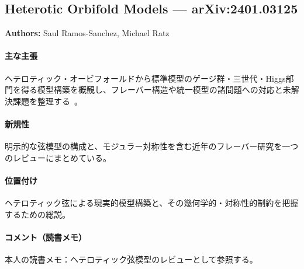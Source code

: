 \subsection{Heterotic Orbifold Models --- arXiv:2401.03125}

\textbf{Authors:} Saul Ramos-Sanchez, Michael Ratz

\paragraph{主な主張}
ヘテロティック・オービフォールドから標準模型のゲージ群・三世代・Higgs部門を得る模型構築を概観し、フレーバー構造や統一模型の諸問題への対応と未解決課題を整理する~\cite{Ramos-Sanchez:2024keh}。

\paragraph{新規性}
明示的な弦模型の構成と、モジュラー対称性を含む近年のフレーバー研究を一つのレビューにまとめている。

\paragraph{位置付け}
ヘテロティック弦による現実的模型構築と、その幾何学的・対称性的制約を把握するための総説。

\paragraph{コメント（読書メモ）}
本人の読書メモ：ヘテロティック弦模型のレビューとして参照する。
